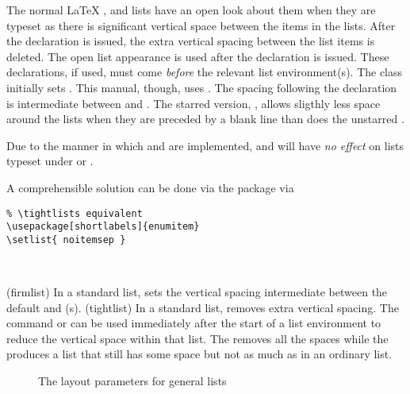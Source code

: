 The normal LaTeX ,  and  lists 
have an open
look about them when they are typeset as there is significant vertical space
between the items in the lists. After the declaration \cmd{\tightlists} is
issued, the extra vertical spacing between the list items is deleted. The open
list appearance is used after the  declaration is issued.
These declarations, if used, must come \emph{before} the relevant list 
environment(s). The class initially sets . This manual,
though, uses \cmd{\tightlists}. The spacing following the \cmd{\firmlists} 
declaration is intermediate between  and \cmd{\tightlists}.
The starred version, \cmd{\firmlists*}, allows sligthly less space around 
the lists when they are preceded by a blank line than does the 
unstarred \cmd{\firmlists}.
\begin{caveat}
  Due to the manner in which \cmd{\small} and \cmd{\footnotesize} are
  implemented, \cmd{\tightlists} and \cmd{\firmlists} will have \emph{no
    effect} on lists typeset under \cmd{\small} or
  \cmd{\footnotesize}.

  A comprehensible solution can be done via the 
  package via
\begin{verbatim}
% \tightlists equivalent
\usepackage[shortlabels]{enumitem}
\setlist{ noitemsep }
\end{verbatim}
\end{caveat}




\begin{syntax}
\cmd{\firmlist} \cmd{\tightlist} \\
\end{syntax}
\glossary(firmlist)
  {}%
  {In a standard list, sets the vertical spacing intermediate between
  the default and (s).}
\glossary(tightlist)
  {}%
  {In a standard list, removes extra vertical spacing.}
The command \cmd{\firmlist} or \cmd{\tightlist} can be used immediately
after the start of a list environment to reduce the vertical space within
that list. The \cmd{\tightlist} removes all the spaces while the
\cmd{\firmlist} produces a list that still has some space but not as much
as in an ordinary list.



\begin{figure}
\centering
\drawparameterstrue
\drawlist
\caption{The layout parameters for general lists}\label{fig:listlay}
\end{figure}

